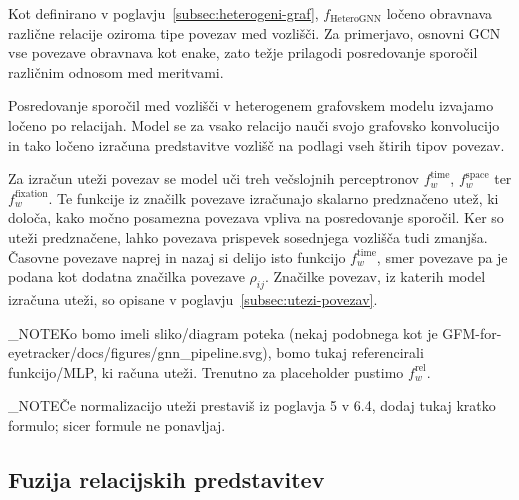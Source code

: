 
Kot definirano v poglavju~\ref{subsec:heterogeni-graf}, $f_{\text{HeteroGNN}}$ ločeno obravnava različne relacije oziroma tipe povezav med vozlišči. 
Za primerjavo, osnovni GCN vse povezave obravnava kot enake, zato težje prilagodi posredovanje sporočil različnim odnosom med meritvami.

Posredovanje sporočil med vozlišči v heterogenem grafovskem modelu izvajamo ločeno po relacijah.
Model se za vsako relacijo nauči svojo grafovsko konvolucijo in tako ločeno izračuna predstavitve vozlišč na podlagi vseh štirih tipov povezav.

Za izračun uteži povezav se model uči treh večslojnih perceptronov $f_w^{\mathrm{time}}$, $f_w^{\mathrm{space}}$ ter $f_w^{\mathrm{fixation}}$.
Te funkcije iz značilk povezave izračunajo skalarno predznačeno utež, ki določa, kako močno posamezna povezava vpliva na posredovanje sporočil. 
Ker so uteži predznačene, lahko povezava prispevek sosednjega vozlišča tudi zmanjša.
Časovne povezave naprej in nazaj si delijo isto funkcijo $f_w^{\mathrm{time}}$, smer povezave pa je podana kot dodatna značilka povezave $\rho_{ij}$.
Značilke povezav, iz katerih model izračuna uteži, so opisane v poglavju~\ref{subsec:utezi-povezav}.

\END_NOTE{Ko bomo imeli sliko/diagram poteka (nekaj podobnega kot je GFM-for-eyetracker/docs/figures/gnn_pipeline.svg), bomo tukaj referencirali funkcijo/MLP, ki računa uteži. Trenutno za placeholder pustimo $f_w^{\mathrm{rel}}$.} 

\END_NOTE{Če normalizacijo uteži prestaviš iz poglavja 5 v 6.4, dodaj tukaj kratko formulo; sicer formule ne ponavljaj.}

\subsection{Fuzija relacijskih predstavitev}
\label{subsec:fuzija}

